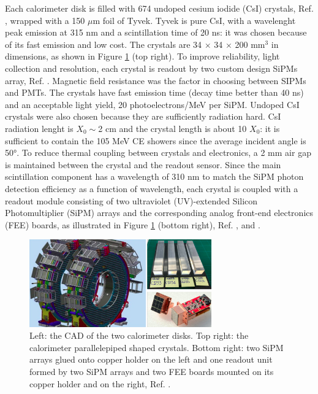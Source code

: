 Each calorimeter disk is filled with 674 undoped cesium iodide (CsI) crystals, Ref. \cite{em6}, wrapped with a 150 $\mu$m foil of Tyvek. 
Tyvek is pure CsI, with a wavelenght peak emission at 315 nm and a scintillation time of 20 ns: it was chosen because of its
fast emission and low cost. The crystals are 34 $\times$ 34 $\times$ 200 mm$^3$ in dimensions, as shown in Figure \ref{fig:calo2} (top right). 
To improve reliability, light collection and resolution, each crystal is readout by two custom design SiPMs array, Ref. \cite{em1}. 
Magnetic field resistance was the factor in choosing between SIPMs and PMTs.
The crystals have fast emission time (decay time better than 40 ns) and an acceptable light yield, 20 photoelectrons/MeV per SiPM.
Undoped CsI crystals were also chosen because they are sufficiently radiation hard.
CsI radiation lenght is $X_0 \sim $2 cm and the crystal length is about 10 $X_0$:
it is sufficient to contain the 105 MeV CE showers since the average incident angle is 50°. 
To reduce thermal coupling between crystals and electronics, a 2 mm air gap is maintained between the crystal and the readout sensor. 
Since the main scintillation component has a wavelength of 310 nm to match the SiPM
photon detection efficiency as a function of wavelength, each crystal is coupled with a readout 
module consisting of two ultraviolet (UV)-extended Silicon Photomultiplier (SiPM) arrays
and the corresponding analog front-end electronics (FEE) boards, as illustrated in Figure \ref{fig:calo2} (bottom right), 
Ref. \cite{em5}, \cite{em2} and \cite{em3}. 
\begin{figure}[!h]
    \centering
    \includegraphics[width =0.7\textwidth]{figures/png/Screenshot_20240322_121000.png}
    \caption{Left: the CAD of the two calorimeter disks. Top right: the calorimeter parallelepiped shaped crystals.
            Bottom right: two SiPM arrays glued onto copper holder on the left and one readout 
            unit formed by two SiPM arrays and two FEE boards mounted on its
            copper holder and on the right, Ref. \cite{em4}.}
    \label{fig:calo2}
\end{figure}
